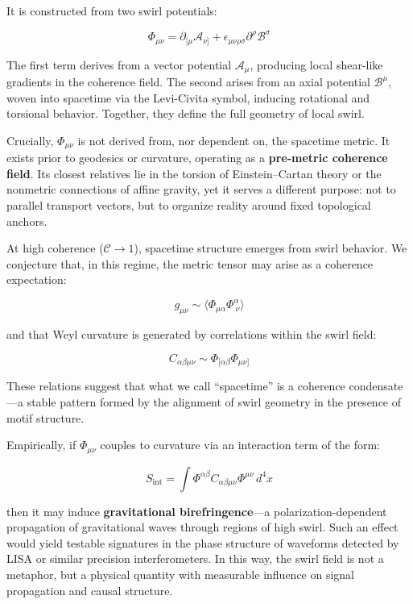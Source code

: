 \documentclass[
  11pt,
]{article}
\begin{document}
It is constructed from two swirl potentials:

\[
\Phi_{\mu\nu} = \partial_{[\mu} \mathcal{A}_{\nu]} + \epsilon_{\mu\nu\rho\sigma} \partial^\rho \mathcal{B}^\sigma
\]

The first term derives from a vector potential \(\mathcal{A}_\mu\),
producing local shear-like gradients in the coherence field. The second
arises from an axial potential \(\mathcal{B}^\mu\), woven into spacetime
via the Levi-Civita symbol, inducing rotational and torsional behavior.
Together, they define the full geometry of local swirl.

Crucially, \(\Phi_{\mu\nu}\) is not derived from, nor dependent on, the
spacetime metric. It exists prior to geodesics or curvature, operating
as a \textbf{pre-metric coherence field}. Its closest relatives lie in
the torsion of Einstein--Cartan theory or the nonmetric connections of
affine gravity, yet it serves a different purpose: not to parallel
transport vectors, but to organize reality around fixed topological
anchors.

At high coherence (\(\mathcal{C} \to 1\)), spacetime structure emerges
from swirl behavior. We conjecture that, in this regime, the metric
tensor may arise as a coherence expectation:

\[
g_{\mu\nu} \sim \langle \Phi_{\mu\alpha} \Phi^\alpha_{\ \nu} \rangle
\]

and that Weyl curvature is generated by correlations within the swirl
field:

\[
C_{\alpha\beta\mu\nu} \sim \Phi_{[\alpha\beta} \Phi_{\mu\nu]}
\]

These relations suggest that what we call ``spacetime'' is a coherence
condensate---a stable pattern formed by the alignment of swirl geometry
in the presence of motif structure.

Empirically, if \(\Phi_{\mu\nu}\) couples to curvature via an
interaction term of the form:

\[
S_{\text{int}} = \int \Phi^{\alpha\beta} C_{\alpha\beta\mu\nu} \Phi^{\mu\nu} \, d^4x
\]

then it may induce \textbf{gravitational birefringence}---a
polarization-dependent propagation of gravitational waves through
regions of high swirl. Such an effect would yield testable signatures in
the phase structure of waveforms detected by LISA or similar precision
interferometers. In this way, the swirl field is not a metaphor, but a
physical quantity with measurable influence on signal propagation and
causal structure.
\end{document}
